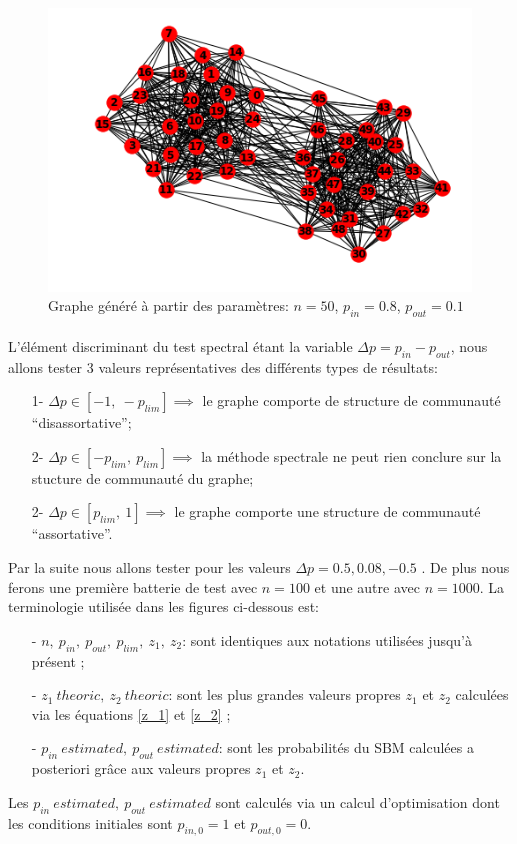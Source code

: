 \begin{figure}[H]
\centering
\includegraphics[scale=0.6]{static/graph_n50_pin08_pout01.png}
\caption{Graphe généré à partir des paramètres: $n=50$, $p_{in}=0.8$, $p_{out}=0.1$}
\end{figure}

\paragraph{ }\label{par: p_lim law}
L'élément discriminant du test spectral étant la variable $ \Delta p= p_{in} - p_{out}$, nous allons tester 3 valeurs représentatives des différents types de résultats:
\begin{itemize}
	\item[1-] $\Delta p \in [-1,\: -p_{lim}] \implies$ le graphe comporte de structure de communauté ``disassortative'';
	\item[2-] $\Delta p \in [-p_{lim},\: p_{lim}] \implies$ la méthode spectrale ne peut rien conclure sur la stucture de communauté du graphe;
	\item[2-] $\Delta p \in [p_{lim},\: 1] \implies$ le graphe comporte une structure de communauté ``assortative''.\\
\end{itemize}

Par la suite nous allons tester pour les valeurs $\Delta p= 0.5, 0.08, -0.5$ .
De plus nous ferons une première batterie de test avec $n=100$ et une autre avec $n=1000$.
La terminologie utilisée dans les figures ci-dessous est:
\begin{itemize} 
	\item[- \underline{$n,\: p_{in},\: p_{out},\: p_{lim},\: z_1,\: z_2$}:] sont identiques aux notations utilisées jusqu'à présent ;
	\item[- \underline{$z_1\: theoric, \:z_2\: theoric$}:] sont les plus grandes valeurs propres $z_1$ et $z_2$ calculées via les équations \eqref{z_1} et \eqref{z_2} ;    
	\item[- \underline{$p_{in}\: estimated, \:p_{out}\: estimated$}:] sont les probabilités du SBM calculées a posteriori grâce aux valeurs propres $z_1$ et $z_2$.\\
\end{itemize}
Les $p_{in}\: estimated, \:p_{out}\: estimated$ sont calculés via un calcul d'optimisation dont les conditions initiales sont $p_{in, 0} = 1$ et $p_{out, 0} = 0$.\\


